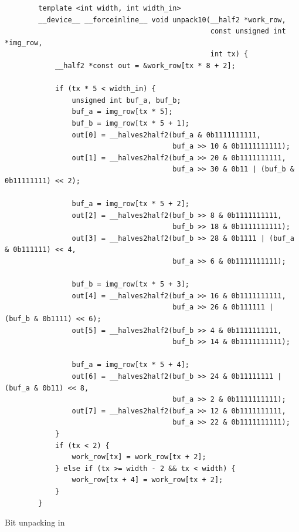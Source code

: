 \begin{listing}[H]
    \begin{verbatim}
        template <int width, int width_in>
        __device__ __forceinline__ void unpack10(__half2 *work_row, 
                                                 const unsigned int *img_row,
                                                 int tx) {
            __half2 *const out = &work_row[tx * 8 + 2];
        
            if (tx * 5 < width_in) {
                unsigned int buf_a, buf_b;
                buf_a = img_row[tx * 5];
                buf_b = img_row[tx * 5 + 1];
                out[0] = __halves2half2(buf_a & 0b1111111111, 
                                        buf_a >> 10 & 0b1111111111);
                out[1] = __halves2half2(buf_a >> 20 & 0b1111111111,
                                        buf_a >> 30 & 0b11 | (buf_b & 0b11111111) << 2);
        
                buf_a = img_row[tx * 5 + 2];
                out[2] = __halves2half2(buf_b >> 8 & 0b1111111111, 
                                        buf_b >> 18 & 0b1111111111);
                out[3] = __halves2half2(buf_b >> 28 & 0b1111 | (buf_a & 0b111111) << 4,
                                        buf_a >> 6 & 0b1111111111);

                buf_b = img_row[tx * 5 + 3];
                out[4] = __halves2half2(buf_a >> 16 & 0b1111111111,
                                        buf_a >> 26 & 0b111111 | (buf_b & 0b1111) << 6);
                out[5] = __halves2half2(buf_b >> 4 & 0b1111111111, 
                                        buf_b >> 14 & 0b1111111111);
        
                buf_a = img_row[tx * 5 + 4];
                out[6] = __halves2half2(buf_b >> 24 & 0b11111111 | (buf_a & 0b11) << 8,
                                        buf_a >> 2 & 0b1111111111);
                out[7] = __halves2half2(buf_a >> 12 & 0b1111111111, 
                                        buf_a >> 22 & 0b1111111111);
            }
            if (tx < 2) {
                work_row[tx] = work_row[tx + 2];
            } else if (tx >= width - 2 && tx < width) {
                work_row[tx + 4] = work_row[tx + 2];
            }
        }
    \end{verbatim}
    \caption{Bit unpacking in \cuda}
\end{listing}